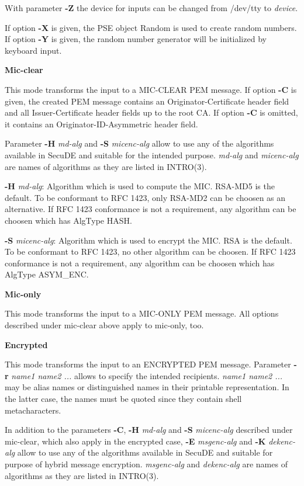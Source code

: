 With parameter {\bf -Z} the device for inputs can be changed from /dev/tty to {\em device}.

If option {\bf -X} is given, the PSE object Random
is used to create random numbers.
If option {\bf -Y} is given, the random number generator
will be initialized by keyboard input.

{\large\bf Mic-clear}

This mode transforms the input to a MIC-CLEAR PEM message. If option {\bf -C} is given, the created
PEM message contains an Originator-Certificate header field and all Issuer-Certificate header fields
up to the root CA. If option {\bf -C} is omitted, it contains an Originator-ID-Asymmetric header
field.

Parameter {\bf -H} {\em md-alg} and {\bf -S} {\em micenc-alg}
allow to use any of the algorithms available in SecuDE and suitable
for the intended purpose. {\em md-alg} and {\em micenc-alg}
are names of algorithms as they are listed in INTRO(3).

{\bf -H} {\em md-alg}: Algorithm which is used to compute the MIC. RSA-MD5 is the default.
To be conformant to RFC 1423, only RSA-MD2 can be choosen as an alternative. If RFC 1423
conformance is not a requirement, any algorithm can be choosen which has AlgType HASH.

{\bf -S} {\em micenc-alg}: Algorithm which is used to encrypt the MIC. RSA is the default.
To be conformant to RFC 1423, no other algorithm can be choosen. If RFC 1423
conformance is not a requirement, any algorithm can be choosen which has AlgType ASYM\_ENC.

{\large\bf Mic-only}

This mode transforms the input to a MIC-ONLY PEM message. All options described under mic-clear
above apply to mic-only, too.

{\large\bf Encrypted}

This mode transforms the input to an ENCRYPTED PEM message. Parameter {\bf -r} {\em name1 name2 
...}
allows to specify the intended recipients. {\em name1 name2 ...} may be alias names or distinguished
names in their printable representation. In the latter case, the names must be quoted since they
contain shell metacharacters.

In addition to the parameters {\bf -C}, {\bf -H} {\em md-alg} and {\bf -S} {\em micenc-alg} 
described under mic-clear, which also apply in the encrypted case, {\bf -E} {\em msgenc-alg} and
{\bf -K} {\em dekenc-alg} allow to use any of the algorithms available in SecuDE and suitable 
for purpose of hybrid message encryption. {\em msgenc-alg} and {\em dekenc-alg}
are names of algorithms as they are listed in INTRO(3).

